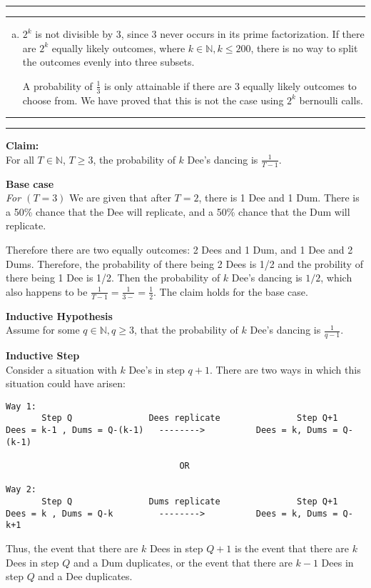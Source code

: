 \documentclass[11pt]{article}
\newcounter{questionCounter}
\newcounter{partCounter}[questionCounter]
\newenvironment{question}[2][\arabic{questionCounter}]{%
    \setcounter{partCounter}{0}%
    \vspace{.25in} \hrule \vspace{0.5em}%
        \noindent{\bf #2}%
    \vspace{0.8em} \hrule \vspace{.10in}%
    \addtocounter{questionCounter}{1}%
}{}
\begin{document}
\begin{question}{Don't Eat the Mushroom}
\begin{enumerate}[a.]
\item $2^k$ is not divisible by 3, since 3 never occurs in its prime factorization.
If there are $2^k$ equally likely outcomes, where $k \in \mathbb{N}, k\leq 200$,
there is no way to split the outcomes evenly into three subsets.

A probability of $\frac{1}{3}$ is only attainable if there are 3 equally likely
outcomes to choose from. We have proved that this is not the case using 
$2^k$ bernoulli calls.
\end{enumerate}
\end{question}
\begin{question}{DumDumDeeDum}
\textbf{Claim:}\\
 For all $T \in \mathbb{N}$, $T\geq3$, the probability of $k$ Dee's dancing is $\frac{1}{T-1}$.

\textbf{Base case}\\
\emph{For $(T=3)$}
We are given that after $T=2$, there is 1 Dee and 1 Dum. 
There is a 50\% chance that the Dee will replicate,
and a 50\% chance that the Dum will replicate. 

Therefore there are two equally outcomes: 2 Dees and 1 Dum, and 1 Dee and 2 Dums. 
Therefore, the probability of there being 2 Dees is 1/2 and the probility of there
being 1 Dee is 1/2. Then the probability of $k$ Dee's dancing is $1/2$, which
also happens to be $\frac{1}{T-1} = \frac{1}{3-} = \frac{1}{2}$. 
The claim holds for the base case.

\textbf{Inductive Hypothesis}\\
Assume for some $q \in \mathbb{N}, q \geq 3$, that the probability of $k$ Dee's dancing 
is $\frac{1}{q-1}$.

\textbf{Inductive Step}\\
Consider a situation with $k$ Dee's in step $q+1$. There are two ways in which this situation
could have arisen:
\begin{verbatim}
Way 1:
       Step Q               Dees replicate               Step Q+1
Dees = k-1 , Dums = Q-(k-1)   -------->          Dees = k, Dums = Q-(k-1)

                                  OR

Way 2:
       Step Q               Dums replicate               Step Q+1
Dees = k , Dums = Q-k         -------->          Dees = k, Dums = Q-k+1
\end{verbatim}
Thus, the event that there are $k$ Dees in step $Q+1$ is 
the event that there are $k$ Dees in step $Q$ and a Dum duplicates, 
or the event that there are $k-1$ Dees in step $Q$ and a Dee duplicates.


\end{question}
\end{document}

